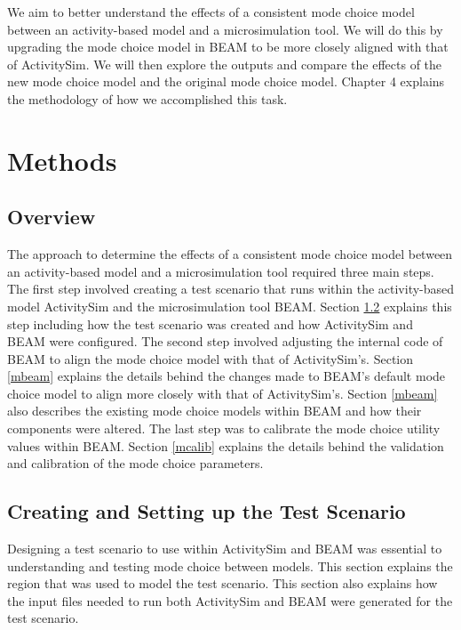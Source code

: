 \documentclass[3p, authoryear, review]{elsarticle} %
\begin{document}
We aim to better understand the effects of a consistent mode choice model between an activity-based model and a microsimulation tool. We will do this by upgrading the mode choice model in BEAM to be more closely aligned with that of ActivitySim. We will then explore the outputs and compare the effects of the new mode choice model and the original mode choice model. Chapter 4 explains the methodology of how we accomplished this task.

\hypertarget{methods}{%
\section{Methods}\label{methods}}

\hypertarget{overview-1}{%
\subsection{Overview}\label{overview-1}}

The approach to determine the effects of a consistent mode choice model between an activity-based model and a microsimulation tool required three main steps. The first step involved creating a test scenario that runs within the activity-based model ActivitySim and the microsimulation tool BEAM. Section \ref{mscen} explains this step including how the test scenario was created and how ActivitySim and BEAM were configured. The second step involved adjusting the internal code of BEAM to align the mode choice model with that of ActivitySim's. Section \ref{mbeam} explains the details behind the changes made to BEAM's default mode choice model to align more closely with that of ActivitySim's. Section \ref{mbeam} also describes the existing mode choice models within BEAM and how their components were altered. The last step was to calibrate the mode choice utility values within BEAM. Section \ref{mcalib} explains the details behind the validation and calibration of the mode choice parameters.

\hypertarget{mscen}{%
\subsection{Creating and Setting up the Test Scenario}\label{mscen}}

Designing a test scenario to use within ActivitySim and BEAM was essential to understanding and testing mode choice between models. This section explains the region that was used to model the test scenario. This section also explains how the input files needed to run both ActivitySim and BEAM were generated for the test scenario.
\end{document}
